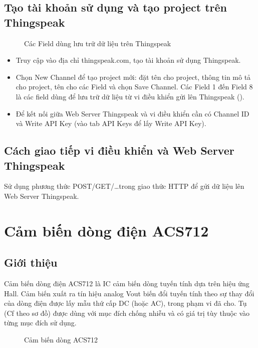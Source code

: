 \subsection{Tạo tài khoản sử dụng và tạo project trên Thingspeak}
    \begin{figure}[htp]
        \begin{center}
        \end{center}
        \caption{Các Field dùng lưu trữ dữ liệu trên Thingspeak} \label{Fig:thingspeak-create-project}
    \end{figure}
    \begin{itemize}
        \item Truy cập vào địa chỉ thingspeak.com, tạo tài khoản sử dụng Thingspeak.
        \item Chọn New Channel để tạo project mới: đặt tên cho project, thông tin mô tả cho project, tên cho các Field và chọn Save Channel. Các Field 1 đến Field 8 là các field dùng để lưu trữ dữ liệu từ vi điều khiển gửi lên Thingspeak (\fig{\ref{Fig:thingspeak-create-project}}).
        \item Để kết nối giữa Web Server Thingspeak và vi điều khiển cần có Channel ID và Write API Key (vào tab API Keys để lấy Write API Key).
    \end{itemize}
\subsection{Cách giao tiếp vi điều khiển và Web Server Thingspeak}
    Sử dụng phương thức POST/GET/\ldots trong giao thức HTTP để gửi dữ liệu lên Web Server Thingspeak.

\section{Cảm biến dòng điện ACS712}
\subsection{Giới thiệu}
    Cảm biến dòng điện ACS712 là IC cảm biến dòng tuyến tính dựa trên hiệu ứng Hall. Cảm biến xuất ra tín hiệu analog Vout biến đổi tuyến tính theo sự thay đổi của dòng điện được lấy mẫu thứ cấp DC (hoặc AC), trong phạm vi đã cho. Tụ (Cf theo sơ đồ) được dùng với mục đích chống nhiễu và có giá trị tùy thuộc vào từng mục đích sử dụng.
        \begin{figure}[htp]
            \begin{center}
            \end{center}
            \caption{Cảm biến dòng ACS712} \label{Fig:acs712}
        \end{figure}
